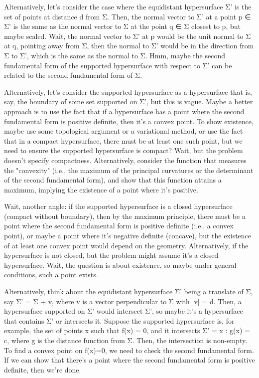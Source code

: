 Alternatively, let's consider the case where the equidistant hypersurface Σ' is the set of points at distance d from Σ. Then, the normal vector to Σ' at a point p ∈ Σ' is the same as the normal vector to Σ at the point q ∈ Σ closest to p, but maybe scaled. Wait, the normal vector to Σ' at p would be the unit normal to Σ at q, pointing away from Σ, then the normal to Σ' would be in the direction from Σ to Σ', which is the same as the normal to Σ. Hmm, maybe the second fundamental form of the supported hypersurface with respect to Σ' can be related to the second fundamental form of Σ.

Alternatively, let's consider the supported hypersurface as a hypersurface that is, say, the boundary of some set supported on Σ', but this is vague. Maybe a better approach is to use the fact that if a hypersurface has a point where the second fundamental form is positive definite, then it's a convex point. To show existence, maybe use some topological argument or a variational method, or use the fact that in a compact hypersurface, there must be at least one such point, but we need to ensure the supported hypersurface is compact? Wait, but the problem doesn't specify compactness. Alternatively, consider the function that measures the "convexity" (i.e., the maximum of the principal curvatures or the determinant of the second fundamental form), and show that this function attains a maximum, implying the existence of a point where it's positive.

Wait, another angle: if the supported hypersurface is a closed hypersurface (compact without boundary), then by the maximum principle, there must be a point where the second fundamental form is positive definite (i.e., a convex point), or maybe a point where it's negative definite (concave), but the existence of at least one convex point would depend on the geometry. Alternatively, if the hypersurface is not closed, but the problem might assume it's a closed hypersurface. Wait, the question is about existence, so maybe under general conditions, such a point exists.

Alternatively, think about the equidistant hypersurface Σ' being a translate of Σ, say Σ' = Σ + v, where v is a vector perpendicular to Σ with |v| = d. Then, a hypersurface supported on Σ' would intersect Σ', so maybe it's a hypersurface that contains Σ' or intersects it. Suppose the supported hypersurface is, for example, the set of points x such that f(x) = 0, and it intersects Σ' = {x : g(x) = c}, where g is the distance function from Σ. Then, the intersection is non-empty. To find a convex point on f(x)=0, we need to check the second fundamental form. If we can show that there's a point where the second fundamental form is positive definite, then we're done.

